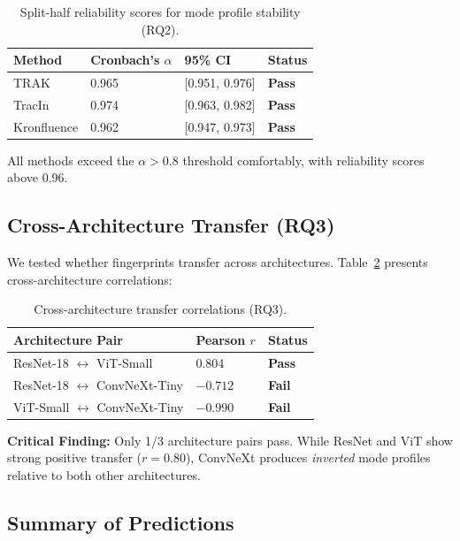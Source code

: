 \begin{table}[h]
\centering
\begin{tabular}{@{}llll@{}}
\toprule
Method & Cronbach's $\alpha$ & 95\% CI & Status \\
\midrule
TRAK & 0.965 & [0.951, 0.976] & \textbf{Pass} \\
TracIn & 0.974 & [0.963, 0.982] & \textbf{Pass} \\
Kronfluence & 0.962 & [0.947, 0.973] & \textbf{Pass} \\
\bottomrule
\end{tabular}
\caption{Split-half reliability scores for mode profile stability (RQ2).}
\label{tab:stability}
\end{table}

All methods exceed the $\alpha > 0.8$ threshold comfortably, with reliability scores above 0.96.

\subsection{Cross-Architecture Transfer (RQ3)}

We tested whether fingerprints transfer across architectures. Table~\ref{tab:transfer} presents cross-architecture correlations:

\begin{table}[h]
\centering
\begin{tabular}{@{}lll@{}}
\toprule
Architecture Pair & Pearson $r$ & Status \\
\midrule
ResNet-18 $\leftrightarrow$ ViT-Small & 0.804 & \textbf{Pass} \\
ResNet-18 $\leftrightarrow$ ConvNeXt-Tiny & $-0.712$ & \textbf{Fail} \\
ViT-Small $\leftrightarrow$ ConvNeXt-Tiny & $-0.990$ & \textbf{Fail} \\
\bottomrule
\end{tabular}
\caption{Cross-architecture transfer correlations (RQ3).}
\label{tab:transfer}
\end{table}

\textbf{Critical Finding:} Only 1/3 architecture pairs pass. While ResNet and ViT show strong positive transfer ($r = 0.80$), ConvNeXt produces \emph{inverted} mode profiles relative to both other architectures.

\subsection{Summary of Predictions}

